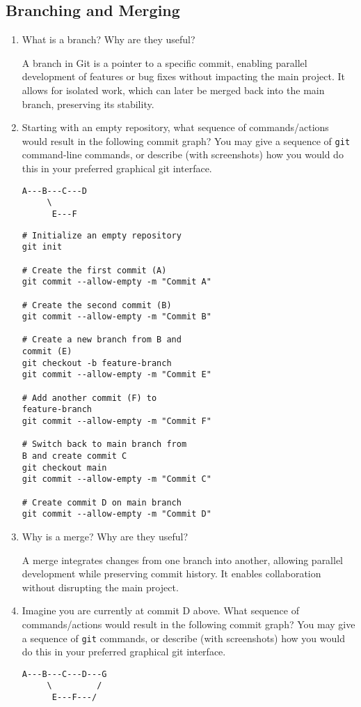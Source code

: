 \documentclass[10pt,twocolumn]{article}
\begin{document}
\subsection{Branching and Merging}

\begin{enumerate}
\item What is a branch? Why are they useful?

A branch in Git is a pointer to a specific commit, enabling parallel development of features or bug fixes without impacting the main project. It allows for isolated work, which can later be merged back into the main branch, preserving its stability.

\item Starting with an empty repository, what sequence of commands/actions would result in the following commit graph? You may give a sequence of \texttt{git} command-line commands, or describe (with screenshots) how you would do this in your preferred graphical git interface.
\begin{verbatim}
A---B---C---D
     \
      E---F
\end{verbatim}

\begin{verbatim}
# Initialize an empty repository
git init

# Create the first commit (A)
git commit --allow-empty -m "Commit A"

# Create the second commit (B)
git commit --allow-empty -m "Commit B"

# Create a new branch from B and 
commit (E)
git checkout -b feature-branch
git commit --allow-empty -m "Commit E"

# Add another commit (F) to 
feature-branch
git commit --allow-empty -m "Commit F"

# Switch back to main branch from 
B and create commit C
git checkout main
git commit --allow-empty -m "Commit C"

# Create commit D on main branch
git commit --allow-empty -m "Commit D"
\end{verbatim}

\item Why is a merge? Why are they useful?

A merge integrates changes from one branch into another, allowing parallel development while preserving commit history. It enables collaboration without disrupting the main project.

\item Imagine you are currently at commit D above. What sequence of commands/actions would result in the following commit graph? You may give a sequence of \texttt{git} commands, or describe (with screenshots) how you would do this in your preferred graphical git interface.
\begin{verbatim}
A---B---C---D---G
     \         /
      E---F---/
\end{verbatim}


\end{enumerate}
\end{document}
